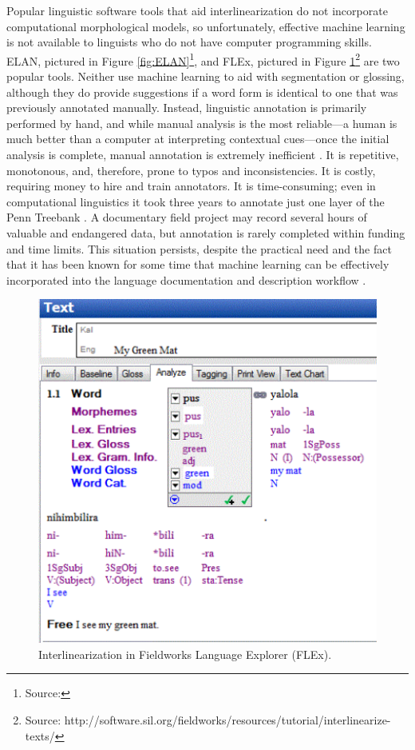 \documentclass[12pt]{article}
\begin{document}
Popular linguistic software tools that aid interlinearization do not incorporate computational morphological models, so unfortunately, effective machine learning is not available to linguists who do not have computer programming skills. ELAN, pictured in Figure \ref{fig:ELAN}\footnote{Source: }, and FLEx, pictured in Figure \ref{fig:FLEX}\footnote{Source: http://software.sil.org/fieldworks/resources/tutorial/interlinearize-texts/} are two popular tools. Neither use machine learning to aid with segmentation or glossing, although they do provide suggestions if a word form is identical to one that was previously annotated manually. Instead, linguistic annotation is primarily performed by hand, and while manual analysis is the most reliable---a human is much better than a computer at interpreting contextual cues---once the initial analysis is complete, manual annotation is extremely inefficient \cite{Baldridge06,baldridge_how_2009,palmer_semi-automated_2009}. It is repetitive, monotonous, and, therefore, prone to typos and inconsistencies. It is costly, requiring money to hire and train annotators. It is time-consuming; even in computational linguistics it took three years to annotate just one layer of the Penn Treebank \cite{taylor_penn_2003} \cite{duong_natural_2017,he_humanloop_2016}. A documentary field project may record several hours of valuable and endangered data, but annotation is rarely completed within funding and time limits. This situation persists, despite the practical need and the fact that it has been known for some time that machine learning can be effectively incorporated into the language documentation and description workflow \cite{baldridge_how_2009,palmer_semi-automated_2009,palmer_evaluating_2009}.


\begin{figure}[ht]
\label{fig:FLEX}
\begin{center}
\includegraphics[width=0.40\columnwidth]{FLExIGT.png}
\caption{Interlinearization in Fieldworks Language Explorer (FLEx).}
\end{center}
\end{figure}
\end{document}
